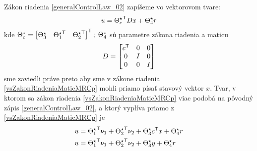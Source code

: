 \documentclass[a4paper, 10pt, ]{article}
\begin{document}
Zákon riadenia \eqref{generalControlLaw_02} zapíšeme vo vektorovom tvare:
\begin{equation} \label{vsZakonRiadeniaMaticMRCp}
	u = {\Theta_c^\star}^{\mathsf{T}} D x + \Theta_4^\star r
\end{equation}
kde $ \Theta_c^\star = \begin{bmatrix} \Theta_3^\star & {\Theta_1^\star}^{\mathsf{T}} & {\Theta_2^\star}^{\mathsf{T}} \end{bmatrix}^{\mathsf{T}}; \; \Theta_4^\star $ sú parametre zákona riadenia a maticu
\begin{align*}
	D = \begin{bmatrix} c^{\mathsf{T}} & 0 & 0 \\ 0 & I & 0 \\ 0 & 0 & I \end{bmatrix}
\end{align*}
sme zaviedli práve preto aby sme v zákone riadenia \eqref{vsZakonRiadeniaMaticMRCp} mohli priamo písať stavový vektor $x$. Tvar, v ktorom sa zákon riadenia \eqref{vsZakonRiadeniaMaticMRCp} viac podobá na pôvodný zápis \eqref{generalControlLaw_02}, a ktorý vyplíva priamo z \eqref{vsZakonRiadeniaMaticMRCp} je
\begin{subequations} \label{vsZakonRiadeniaMaticMRCp_02}
	\begin{align}
		u &= {\Theta_1^\star}^{\mathsf{T}} \nu_1 + {\Theta_2^\star}^{\mathsf{T}} \nu_2 + \Theta_3^\star {c}^{\mathsf{T}} x + \Theta_4^\star r \\
		u &= {\Theta_1^\star}^{\mathsf{T}} \nu_1 + {\Theta_2^\star}^{\mathsf{T}} \nu_2 + \Theta_3^\star y + \Theta_4^\star r
	\end{align}
\end{subequations}
\end{document}
